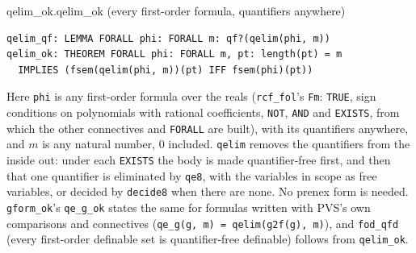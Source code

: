 \documentclass[11pt]{article}
\begin{document}
\begin{thmbox}{qelim\_ok.qelim\_ok \quad (every first-order formula, quantifiers anywhere)}
\begin{Verbatim}[fontsize=\small]
qelim_qf: LEMMA FORALL phi: FORALL m: qf?(qelim(phi, m))
qelim_ok: THEOREM FORALL phi: FORALL m, pt: length(pt) = m
  IMPLIES (fsem(qelim(phi, m))(pt) IFF fsem(phi)(pt))
\end{Verbatim}
\end{thmbox}
Here \texttt{phi} is any first-order formula over the reals (\texttt{rcf\_fol}'s \texttt{Fm}: \texttt{TRUE}, sign conditions on
polynomials with rational coefficients, \texttt{NOT}, \texttt{AND} and \texttt{EXISTS}, from which the other
connectives and \texttt{FORALL} are built), with its quantifiers anywhere, and $m$ is any natural number, $0$
included. \texttt{qelim} removes the quantifiers from the inside out: under each \texttt{EXISTS} the body is made
quantifier-free first, and then that one quantifier is eliminated by \texttt{qe8}, with the variables in scope as
free variables, or decided by \texttt{decide8} when there are none. No prenex form is needed.
\texttt{gform\_ok}'s \texttt{qe\_g\_ok} states the same for formulas written with PVS's own comparisons and
connectives (\texttt{qe\_g(g, m) = qelim(g2f(g), m)}), and \texttt{fod\_qfd} (every first-order definable set is
quantifier-free definable) follows from \texttt{qelim\_ok}.
\end{document}
